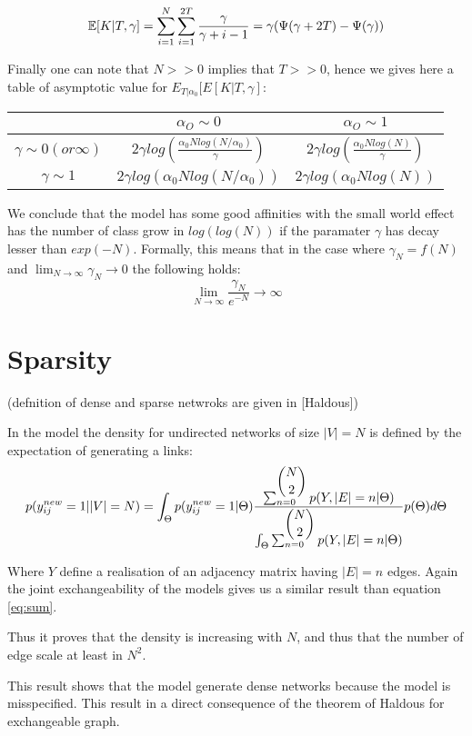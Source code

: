 \documentclass[a4paper, 12pt]{article}
\begin{document}
\begin{equation}
\mathbb{E}[K|T, \gamma] = \sum_{i=1}^N\sum_{i=1}^{2T} \frac{\gamma}{\gamma +i-1} = \gamma (\Psi(\gamma+2T) - \Psi(\gamma))
\end{equation}

Finally one can note that $N >> 0$ implies that $T>>0$, hence we gives here a table of asymptotic value for $E_{T|\alpha_0}[E[K|T, \gamma]$:

	\begin{tabular}{c|cc}
		 & $\alpha_O \sim 0$&$\alpha_O \sim 1$ \\
		\hline
		$\gamma \sim 0 (or \infty)$ & $2\gamma log(\frac{\alpha_0Nlog(N/\alpha_0)}{\gamma})$ & $2\gamma log(\frac{\alpha_0Nlog(N)}{\gamma})$ \\
		$\gamma \sim 1$ & $2\gamma log(\alpha_0Nlog(N/\alpha_0))$ &  $2\gamma log(\alpha_0Nlog(N))$
	\end{tabular}

We conclude that the model has some good affinities with the small world effect has the number of class grow in $log(log(N))$ if the paramater $\gamma$ has decay lesser than $exp(-N)$. Formally, this means that in the case where  $\gamma_N = f(N)$ and $\lim_{N\to\infty}\gamma_N \to 0$ the following holds:
$$\lim_{N\to\infty} \frac{\gamma_N}{e^{-N}} \to \infty$$


\section{Sparsity}
(defnition of dense and sparse netwroks are given in [Haldous])


In the model the density for undirected networks of size $|V|=N$ is defined by the expectation of generating a links:
\begin{equation}
p(y_{ij}^{new}=1| |V|=N) =  \int_{\Theta} p(y_{ij}^{new}=1|\Theta) \frac{\sum_{n=0}^{\dbinom{N}{2}} p(Y,|E|=n | \Theta)}{\int_{\Theta}\sum_{n=0}^{\dbinom{N}{2}}p(Y,|E|=n | \Theta)} p(\Theta) d\Theta
\end{equation}

Where $Y$ define a realisation of an adjacency matrix having $|E|=n$ edges. Again the joint exchangeability of the models gives us a similar result than equation \eqref{eq:sum}.

Thus it proves that the density is increasing with $N$, and thus that the number of edge scale at least in $N^2$. 

This result shows that the model generate dense networks because the model is misspecified. This result in a direct consequence of the theorem of Haldous for exchangeable graph.
\end{document}
